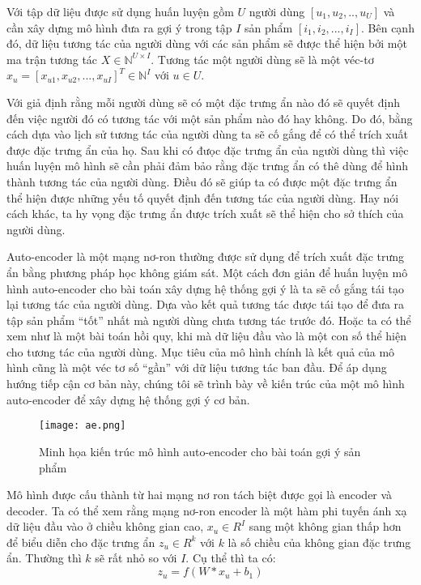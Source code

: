     Với tập dữ liệu được sử dụng huấn luyện gồm $U$ người dùng $[u_1,u_2, .., u_U]$ và cần xây dựng mô hình đưa ra gợi ý trong tập $I$ sản phẩm $[i_1,i_2, ..., i_I]$. Bên cạnh đó, dữ liệu tương tác của người dùng với các sản phẩm sẽ được thể hiện bởi một ma trận tương tác $X \in \mathbb{N}^{U\times I}$. Tương tác một người dùng sẽ là một véc-tơ $x_u = [x_{u1}, x_{u2}, ..., x_{uI}]^T \in \mathbb{N}^I $ với $u \in U$.
    
    Với giả định rằng mỗi người dùng sẽ có một đặc trưng ẩn nào đó sẽ quyết định đến việc người đó có tương tác với một sản phẩm nào đó hay không.
    Do đó, bằng cách dựa vào lịch sử tương tác của người dùng ta sẽ cố gắng để có thể trích xuất được đặc trưng ẩn của họ.
    Sau khi có đưọc đặc trưng ẩn của người dùng thì việc huấn luyện mô hình sẽ cần phải đảm bảo rằng đặc trưng ẩn có thê dùng để hình thành tương tác của người dùng. 
    Điều đó sẽ giúp ta có được một đặc trưng ẩn thể hiện được những yếu tố quyết định đến tương tác của người dùng.
    Hay nói cách khác, ta hy vọng đặc trưng ẩn được trích xuất sẽ thể hiện cho sở thích của người dùng. 

    Auto-encoder là một mạng nơ-ron thường được sử dụng để trích xuất đặc trưng ẩn bằng phương pháp học không giám sát.
    Một cách đơn giản để huấn luyện mô hình auto-encoder cho bài toán xây dựng hệ thống gợi ý là ta sẽ cố gắng tái tạo lại tương tác của người dùng.
    Dựa vào kết quả tương tác được tái tạo để đưa ra tập sản phẩm ``tốt'' nhất mà người dùng chưa tương tác trước đó. 
    Hoặc ta có thể xem như là một bài toán hồi quy, khi mà dữ liệu đầu vào là một con số thể hiện cho tương tác của người dùng.
    Mục tiêu của mô hình chính là kết quả của mô hình cũng là một véc tơ số ``gần'' với dữ liệu tương tác ban đầu.  
    Để áp dụng hướng tiếp cận cơ bản này, chúng tôi sẽ trình bày về kiến trúc của một mô hình auto-encoder để xây dựng hệ thống gợi ý cơ bản.
    \begin{figure}
        \centering
        \texttt{[image: ae.png]}
        \caption{Minh họa kiến trúc mô hình auto-encoder cho bài toán gợi ý sản phẩm}
        \label{fig_recae}
    \end{figure}

    Mô hình được cấu thành từ hai mạng nơ ron tách biệt được gọi là encoder và decoder. 
    Ta có thể xem rằng mạng nơ-ron encoder là một hàm phi tuyến ánh xạ dữ liệu đầu vào ở chiều không gian cao, $x_u \in R^I$ sang một không gian thấp hơn để biểu diễn cho đặc trưng ẩn $z_u \in R^k$ với $k$ là số chiều của không gian đặc trưng ẩn. 
    Thường thì $k$ sẽ rất nhỏ so với $I$. Cụ thể thì ta có:
    \begin{equation}
        z_u = f(W * x_u + b_1)
    \end{equation}

